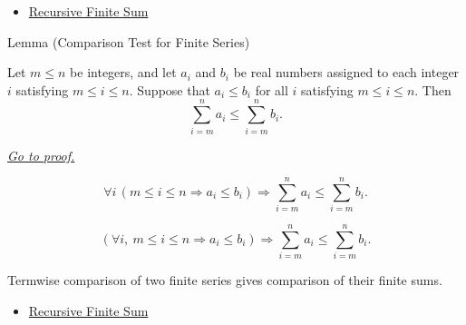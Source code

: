 \begin{dependencies}
\begin{itemize}
  \item \hyperref[def:recursive-finite-sum]{Recursive Finite Sum}
\end{itemize}
\end{dependencies}

\begin{lemmabox}{Lemma (Comparison Test for Finite Series)}
\begin{lemma}
\label{lem:comparison-test-finite-series}

Let \(m \le n\) be integers, and let \(a_i\) and \(b_i\) be real
numbers assigned to each integer \(i\) satisfying \(m \le i \le n\).
Suppose that \(a_i \le b_i\) for all \(i\) satisfying \(m \le i \le n\).
Then
\[
  \sum_{i=m}^{n} a_i
  \le
  \sum_{i=m}^{n} b_i.
\]

\smallskip
\noindent
\hyperref[prf:comparison-test-finite-series]{\textit{Go to proof.}}
\end{lemma}
\end{lemmabox}

\begin{remark*}
\[
  \forall i\,(m \le i \le n \Longrightarrow a_i \le b_i)
  \Longrightarrow
  \sum_{i=m}^{n} a_i
  \le
  \sum_{i=m}^{n} b_i.
\]
\end{remark*}

\begin{remark*}
\[
  \left(\forall i,\ m\le i\le n\Rightarrow a_i\le b_i\right)
  \Longrightarrow
  \sum_{i=m}^{n}a_i
  \le
  \sum_{i=m}^{n}b_i.
\]
\end{remark*}

\begin{remark*}[Interpretation]
Termwise comparison of two finite series gives comparison of their finite
sums.
\end{remark*}

\begin{dependencies}
\begin{itemize}
  \item \hyperref[def:recursive-finite-sum]{Recursive Finite Sum}
\end{itemize}
\end{dependencies}
